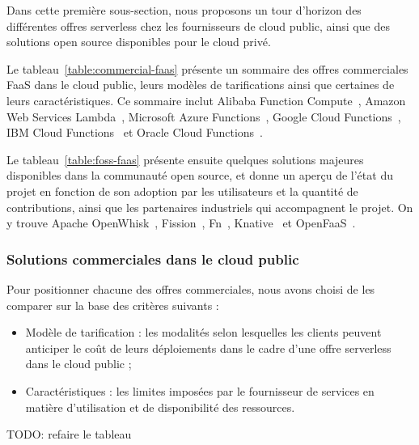 Dans cette première sous-section, nous proposons un tour d'horizon des différentes offres serverless chez les fournisseurs de cloud public, ainsi que des solutions open source disponibles pour le cloud privé.

Le tableau~\ref{table:commercial-faas} présente un sommaire des offres commerciales FaaS dans le cloud public, leurs modèles de tarifications ainsi que certaines de leurs caractéristiques. Ce sommaire inclut Alibaba Function Compute~\cite{alibaba-function-compute}, Amazon Web Services Lambda~\cite{aws-lambda}, Microsoft Azure Functions~\cite{azure-functions}, Google Cloud Functions~\cite{google-cloud-functions}, IBM Cloud Functions~\cite{ibm-cloud-functions} et Oracle Cloud Functions~\cite{oracle-cloud-functions}.

Le tableau~\ref{table:foss-faas} présente ensuite quelques solutions majeures disponibles dans la communauté open source, et donne un aperçu de l'état du projet en fonction de son adoption par les utilisateurs et la quantité de contributions, ainsi que les partenaires industriels qui accompagnent le projet. On y trouve Apache OpenWhisk~\cite{openwhisk}, Fission~\cite{fission}, Fn~\cite{fn}, Knative~\cite{knative} et OpenFaaS~\cite{openfaas}.

\subsubsection{Solutions commerciales dans le cloud public}

Pour positionner chacune des offres commerciales, nous avons choisi de les comparer sur la base des critères suivants :

\begin{itemize}
    \item Modèle de tarification : les modalités selon lesquelles les clients peuvent anticiper le coût de leurs déploiements dans le cadre d'une offre serverless dans le cloud public ;
    \item Caractéristiques : les limites imposées par le fournisseur de services en matière d'utilisation et de disponibilité des ressources.
\end{itemize}

TODO: refaire le tableau


